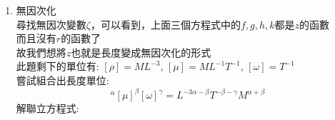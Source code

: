 \documentclass[../main.tex]{subfiles}
\begin{document}
\begin{itemize}
\begin{enumerate}
\begin{itemize}
      從新撰寫上面方程式:
      \begin{align}
       r :\quad & \rho \left(
          \hat f\hat f' f^2 + \hat h \hat f h f' - r g^2
        \right) = -\hat k' k + \mu \left(
          \frac{\hat f' f}{r} + \hat f'' f + \hat f f'' - \frac{\hat ff}{r^2}
        \right)  \nonumber\\
         &\rho \left(
          r f^2 + r h f' - r g^2
        \right) = \mu \left(
          \cancel{\frac{f}{r}} + r f'' - \cancel{\frac{r f}{r^2}}
        \right) \nonumber\\
        & \rho r \left(
          f^2 + h f' - g^2
        \right) = \mu r f'' \nonumber\\
        \Rightarrow \quad & \boxed{\rho \left(
          f^2 + h f' - g^2
        \right) = \mu  f''
        } \label{eq:ch2_3_rotating_disk_r}\\
       \theta :\quad & \rho \left(
          2 \hat f g f + \hat h r h g'
        \right) = \mu rg'' \nonumber\\
        \Rightarrow \quad & \boxed{\rho \left(
          2 r g f + h r g'
        \right) = \mu r g''} \label{eq:ch2_3_rotating_disk_theta}\\
       z:\quad & \rho h h' = -\hat k k' + \mu h'' \nonumber\\
       \Rightarrow \quad & \boxed{\rho h h' = -k' + \mu h''} \label{eq:ch2_3_rotating_disk_z}\\
       \text{Continuity}:\quad &  \left(\frac{1}{r}\hat f  \hat f' \right) f + \hat h h' = 0 \nonumber\\
        \Rightarrow \quad & \boxed{2 f + h' = 0} \label{eq:ch2_3_rotating_disk_continuity}
      \end{align}
    \end{itemize}
    \item 無因次化\\
    尋找無因次變數$\zeta$，可以看到，上面三個方程式中的$f,g,h,k$都是$z$的函數\\
    而且沒有$r$的函數了\\
    故我們想將$z$也就是長度變成無因次化的形式\\
    此題剩下的單位有: $[\rho] = M L^{-3}$, $[\mu] = M L^{-1} T^{-1}$, $[\omega] = T^{-1}$\\
    嘗試組合出長度單位:
    \begin{equation}
      [\rho]^\alpha [\mu]^\beta [\omega]^\gamma = L^{ -3\alpha - \beta } T^{ -\beta - \gamma } M^{ \alpha + \beta }
    \end{equation}
    解聯立方程式:

\end{enumerate}
\end{itemize}
\end{document}
